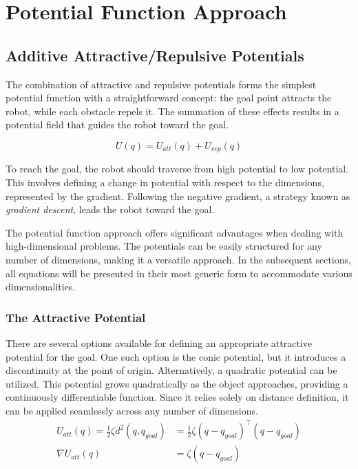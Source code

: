 \documentclass{IEEEtaes}
\begin{document}
{\section{\large \textbf{Potential Function Approach}}

\subsection{Additive Attractive/Repulsive Potentials}
The combination of attractive and repulsive potentials forms the simplest potential function with a straightforward concept: the goal point attracts the robot, while each obstacle repels it. The summation of these effects results in a potential field that guides the robot toward the goal.

\begin{equation*}
    U(q) = U_{att}(q)+ U_{rep}(q)
\end{equation*}

To reach the goal, the robot should traverse from high potential to low potential. This involves defining a change in potential with respect to the dimensions, represented by the gradient. Following the negative gradient, a strategy known as \textit{gradient descent}, leads the robot toward the goal.

The potential function approach offers significant advantages when dealing with high-dimensional problems. The potentials can be easily structured for any number of dimensions, making it a versatile approach. In the subsequent sections, all equations will be presented in their most generic form to accommodate various dimensionalities.
    

\subsubsection{The Attractive Potential}
There are several options available for defining an appropriate attractive potential for the goal. One such option is the conic potential, but it introduces a discontinuity at the point of origin. Alternatively, a quadratic potential can be utilized. This potential grows quadratically as the object approaches, providing a continuously differentiable function. Since it relies solely on distance definition, it can be applied seamlessly across any number of dimensions.
\begin{equation*}
\begin{split}
    U_{att}(q) = \frac{1}{2}\zeta d^2(q,q_{goal}) &= \frac{1}{2} \zeta (q-q_{goal})^\top(q-q_{goal}) \\
    \nabla U_{att}(q) &= \zeta (q-q_{goal})   
\end{split}
\end{equation*}

}
\end{document}
